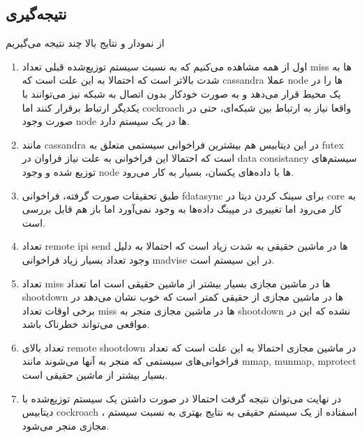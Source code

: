 \subsection{نتیجه‌گیری}
از نمودار و نتایج بالا چند نتیجه می‌گیریم
\begin{enumerate}
    \item اول از همه مشاهده می‌کنیم که به نسبت سیستم توزیع‌شده قبلی تعداد miss ها به شدت بالاتر است که احتمالا به این علت است که cassandra 
    عملا 
    node
    ها را در یک محیط قرار می‌دهد و به صورت خودکار بدون اتصال به شبکه نیز می‌توانند با یکدیگر ارتباط برقرار کنند اما cockroach
    واقعا نیاز به ارتباط بین شبکه‌ای،‌ حتی در صورت وجود 
    node 
    ها در یک سیستم دارد.
    \item
    مانند cassandra 
    در این دیتابیس هم بیشترین فراخوانی سیستمی متعلق به 
    futex 
    است که احتمالا این فراخوانی به علت نیاز فراوان در 
    data consistancy 
    سیستم‌های توزیع شده و وجود node 
    ها با داده‌های یکسان، بسیار به کار می‌رود.
    \item 
    طبق تحقیقات صورت گرفته، فراخوانی fdatasync برای
     سینک کردن دیتا در core به کار می‌رود اما تغییری در مپینگ داده‌ها به وجود نمی‌آورد اما باز هم قابل بررسی است.
     \item 
     تعداد remote ipi send ها در ماشین حقیقی به شدت زیاد است که احتمالا به دلیل وجود تعداد بسیار زیاد فراخوانی madvise در این سیستم است.
     \item 
     تعداد miss ها در ماشین مجازی بسیار بیشتر از ماشین حقیقی است اما تعداد shootdown ها در ماشین مجازی از حقیقی کمتر است که خوب نشان می‌دهد در برخی اوقات تعداد miss ها در ماشین مجازی منجر به shootdown نشده که این در مواقعی می‌تواند خطرناک باشد.
     \item 
     تعداد بالای remote shootdown در ماشین مجازی احتمالا به این علت است که تعداد فراخوانی‌های سیستمی که منجر به آنها می‌شوند مانند mmap, munmap, mprotect 
     بسیار بیشتر از ماشین حقیقی است.
    \item 
    در نهایت می‌توان نتیجه گرفت احتمالا در صورت داشتن یک سیستم توزیع‌شده با دیتابیس cockroach
    ، اسفتاده از یک سیستم حقیقی به نتایج بهتری به نسبت سیستم مجازی منجر می‌شود.
\end{enumerate}